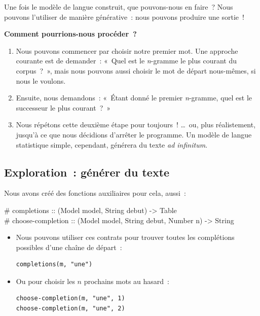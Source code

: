 \documentclass[12pt,a4paper]{article}
\newcommand{\contrat}[1]{%
  \begin{contractbox}
    \ttfamily #1
  \end{contractbox}
}
\begin{document}
Une fois le modèle de langue construit, que pouvons-nous en faire~? Nous pouvons l'utiliser de manière générative~: nous pouvons produire une sortie~!

\begin{keypointbox}
  \textbf{Comment pourrions-nous procéder~?}
  \begin{enumerate}
    \item Nous pouvons commencer par choisir notre premier mot. Une approche courante est de demander~: «~Quel est le \emph{n}-gramme le plus courant du corpus~?~», mais nous pouvons aussi choisir le mot de départ nous-mêmes, si nous le voulons.
    \item Ensuite, nous demandons~: «~Étant donné le premier \emph{n}-gramme, quel est le successeur le plus courant~?~»
    \item Nous répétons cette deuxième étape pour toujours~! …~ou, plus réalistement, jusqu'à ce que nous décidions d'arrêter le programme. Un modèle de langue statistique simple, cependant, générera du texte \emph{ad infinitum}.
  \end{enumerate}
\end{keypointbox}

\subsection{Exploration~: générer du texte}

\begin{keypointbox}
  Nous avons créé des fonctions auxiliaires pour cela, aussi~:
  \contrat{\# completions :: (Model model, String debut) -> Table\\
\# choose-completion :: (Model model, String debut, Number n) -> String}

  \begin{itemize}
    \item Nous pouvons utiliser ces contrats pour trouver toutes les complétions possibles d'une chaîne de départ~:
    \begin{lstlisting}
completions(m, "une")
    \end{lstlisting}
    \item Ou pour choisir les $n$ prochains mots au hasard~:
    \begin{lstlisting}
choose-completion(m, "une", 1)
choose-completion(m, "une", 2)
    \end{lstlisting}
  \end{itemize}
\end{keypointbox}
\end{document}
